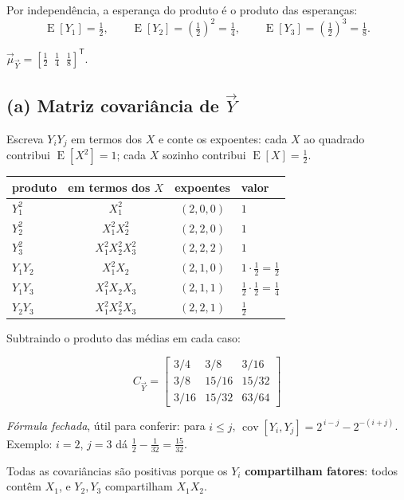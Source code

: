 \documentclass[11pt,a4paper]{article}
\DeclareMathOperator{\E}{E}
\DeclareMathOperator{\cov}{cov}
\begin{document}
Por independência, a esperança do produto é o produto das esperanças:
\[
\E[Y_1]=\tfrac12,\qquad \E[Y_2]=\left(\tfrac12\right)^2=\tfrac14,
\qquad \E[Y_3]=\left(\tfrac12\right)^3=\tfrac18 .
\]

\begin{resp}
$\vec\mu_{\vec Y}=\left[\tfrac12\;\;\tfrac14\;\;\tfrac18\right]^{\mathsf T}$.
\end{resp}

\subsection*{(a) Matriz covariância de $\vec Y$}

Escreva $Y_iY_j$ em termos dos $X$ e conte os expoentes: cada $X$ ao quadrado
contribui $\E[X^2]=1$; cada $X$ sozinho contribui $\E[X]=\tfrac12$.

\begin{center}
\begin{tabular}{lccl}
\toprule
produto & em termos dos $X$ & expoentes & valor \\
\midrule
$Y_1^2$ & $X_1^2$ & $(2,0,0)$ & $1$ \\
$Y_2^2$ & $X_1^2X_2^2$ & $(2,2,0)$ & $1$ \\
$Y_3^2$ & $X_1^2X_2^2X_3^2$ & $(2,2,2)$ & $1$ \\
$Y_1Y_2$ & $X_1^2X_2$ & $(2,1,0)$ & $1\cdot\tfrac12=\tfrac12$ \\
$Y_1Y_3$ & $X_1^2X_2X_3$ & $(2,1,1)$ & $\tfrac12\cdot\tfrac12=\tfrac14$ \\
$Y_2Y_3$ & $X_1^2X_2^2X_3$ & $(2,2,1)$ & $\tfrac12$ \\
\bottomrule
\end{tabular}
\end{center}

Subtraindo o produto das médias em cada caso:

\begin{resp}
\[
C_{\vec Y}=
\begin{bmatrix}
3/4 & 3/8 & 3/16\\[2pt]
3/8 & 15/16 & 15/32\\[2pt]
3/16 & 15/32 & 63/64
\end{bmatrix}
\]
\end{resp}

\emph{Fórmula fechada}, útil para conferir: para $i\le j$,
$\cov[Y_i,Y_j]=2^{\,i-j}-2^{-(i+j)}$. Exemplo: $i=2$, $j=3$ dá
$\tfrac12-\tfrac1{32}=\tfrac{15}{32}$. \checkmark

Todas as covariâncias são positivas porque os $Y_i$ \textbf{compartilham fatores}:
todos contêm $X_1$, e $Y_2,Y_3$ compartilham $X_1X_2$.
\end{document}
